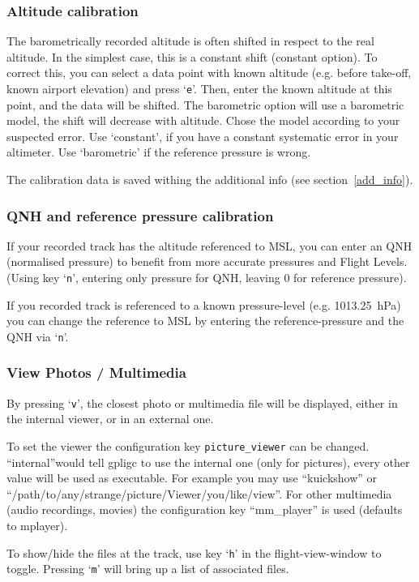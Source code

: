 \subsubsection{Altitude calibration}
The barometrically recorded altitude is often shifted in respect to the real altitude.
In the simplest case, this is a constant shift (constant option).
To correct this, you can select a data point with known altitude
(e.g. before take-off, known airport elevation) and press `\texttt{e}'. 
Then, enter the known altitude at this point, and the data will be shifted.
The barometric option will use a barometric model, the shift will decrease with altitude.
Chose the model according to your suspected error. Use `constant', if you have a constant systematic error in your altimeter.
Use `barometric' if the reference pressure is wrong.

The calibration data is saved withing the additional info (see section~\ref{add_info}).


\subsubsection{QNH and reference pressure calibration}
If your recorded track has the altitude referenced to MSL, you can enter an QNH (normalised pressure) to benefit from more accurate pressures and Flight Levels.
(Using key `\texttt{n}', entering only pressure for QNH, leaving 0 for reference pressure).

If you recorded track is referenced to a known pressure-level (e.g. 1013.25~hPa) you can change the reference to MSL by entering the reference-pressure and the QNH via `\texttt{n}'.


\subsubsection{View Photos / Multimedia}
By pressing `\texttt{v}', the closest photo or multimedia file will be displayed, either in
the internal viewer, or in an external one.

To set the viewer the configuration key \texttt{picture\_viewer} can be changed. ``internal''would tell
gpligc to use the internal one (only for pictures), every other value will be used as executable. For example you may use
``kuickshow'' or ``/path/to/any/strange/picture/Viewer/you/like/view''.
For other multimedia (audio recordings, movies) the configuration key ``mm\_player'' is used (defaults to mplayer).

To show/hide the files at the track, use key `\texttt{h}' in the flight-view-window to toggle. Pressing `\texttt{m}' will bring up a list of associated files.

